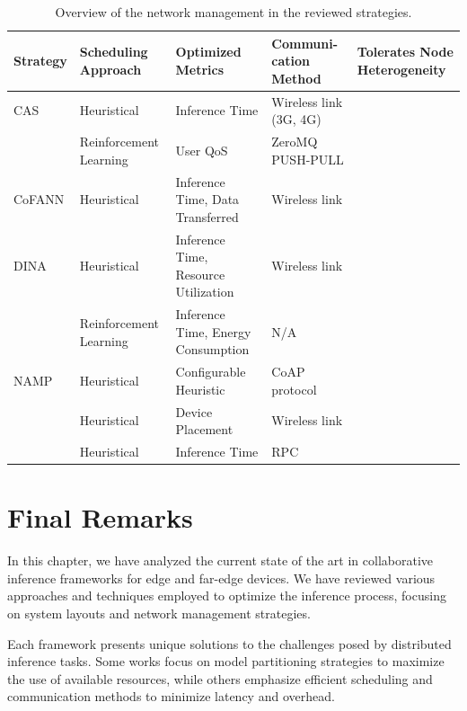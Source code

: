 \begin{table}[ht]
\centering
\begin{tabularx}{\textwidth}{|m{2.5cm}|Y|Y|Y|>{\centering\arraybackslash}m{2.2cm}|}
\hline
\textbf{Strategy} & \textbf{Scheduling Approach} & \textbf{Optimized Metrics} & \textbf{Communi-cation Method} & \textbf{Tolerates Node Heterogeneity} \\
\hline
CAS \cite{wang_context-aware_2021} & Heuristical & Inference Time & Wireless link (3G, 4G) &  \\
\hline
\textcite{chen_deep_2024} & Reinforcement Learning & User \ac{QoS} & ZeroMQ PUSH-PULL &  \\
\hline
CoFANN \cite{tran-van_cofann_2025} & Heuristical & Inference Time, Data Transferred & Wireless link &  \\
\hline
DINA \cite{t_mohammed_distributed_2020} & Heuristical & Inference Time, Resource Utilization & Wireless link &  \\
\hline
\textcite{ma_joint_2025} & Reinforcement Learning & Inference Time, Energy Consumption & N/A &  \\
\hline
NAMP \cite{rego::namp} & Heuristical & Configurable Heuristic & CoAP protocol &  \\
\hline
\textcite{p_dai_joint_2025} & Heuristical & Device Placement & Wireless link &  \\
\hline
\textcite{w_miao_adaptive_2020} & Heuristical & Inference Time & \ac{RPC} & \\
\hline
\end{tabularx}
\vspace{2mm}
\caption{Overview of the network management in the reviewed strategies.}\label{tab:sota_scheduling}
\end{table}

\section{Final Remarks}

In this chapter, we have analyzed the current state of the art in collaborative
inference frameworks for edge and far-edge devices. We have reviewed various
approaches and techniques employed to optimize the inference process, focusing
on system layouts and network management strategies.

Each framework presents unique solutions to the challenges posed by distributed
inference tasks. Some works focus on model partitioning strategies to maximize
the use of available resources, while others emphasize efficient scheduling and
communication methods to minimize latency and overhead.

